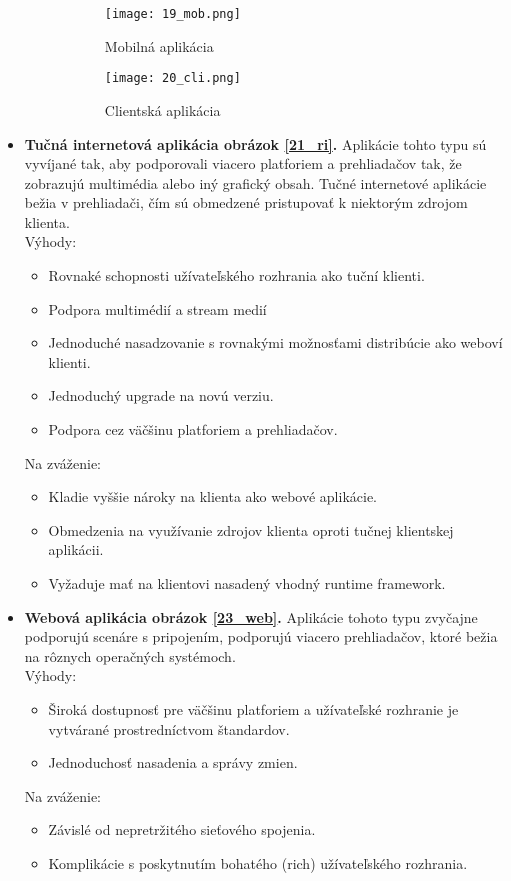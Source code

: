 \begin{itemize}
\begin{figure}[!htbp]
\centering
\begin{subfigure}{0.5\linewidth}
\texttt{[image: 19\_mob.png]}
\caption{Mobilná aplikácia \cite{IOT03}}
\label{19_mob}
\end{subfigure}%
\begin{subfigure}{0.5\linewidth}
\texttt{[image: 20\_cli.png]}
\caption{Clientská aplikácia \cite{IOT03}}
\label{20_cli}
\end{subfigure}
\caption{}
\end{figure}

 
\item
 \textbf{Tučná internetová aplikácia obrázok \ref{21_ri}.} Aplikácie tohto typu sú vyvíjané tak, aby podporovali viacero platforiem a prehliadačov tak, že zobrazujú multimédia alebo iný grafický obsah. Tučné internetové aplikácie bežia v prehliadači, čím sú obmedzené pristupovať k niektorým zdrojom klienta. \\
Výhody: 
 \begin{itemize}
   \item  Rovnaké schopnosti užívateľského rozhrania ako tuční klienti.
   \item  Podpora multimédií a stream medií
   \item  Jednoduché nasadzovanie  s rovnakými možnosťami distribúcie ako weboví klienti. 
   \item Jednoduchý upgrade na novú verziu.
   \item Podpora cez väčšinu platforiem a prehliadačov. 
 \end{itemize}
Na zváženie: 
 \begin{itemize}
   \item Kladie vyššie nároky na klienta ako webové aplikácie.
   \item Obmedzenia na využívanie zdrojov klienta oproti tučnej klientskej aplikácii. 
   \item Vyžaduje mať na klientovi nasadený vhodný runtime framework.
 \end{itemize} 
 
  \item
  \textbf{Webová aplikácia obrázok \ref{23_web}.} Aplikácie tohoto typu zvyčajne podporujú scenáre s pripojením, podporujú viacero prehliadačov, ktoré bežia na rôznych operačných systémoch.\\
Výhody: 
 \begin{itemize}
   \item Široká dostupnosť pre väčšinu platforiem a užívateľské rozhranie je vytvárané prostredníctvom štandardov.
   \item Jednoduchosť nasadenia a správy zmien.
 \end{itemize}
Na zváženie: 
 \begin{itemize}
   \item Závislé od nepretržitého sieťového spojenia.
   \item Komplikácie s poskytnutím bohatého (rich) užívateľského rozhrania.
 \end{itemize}  
 

\end{itemize}

